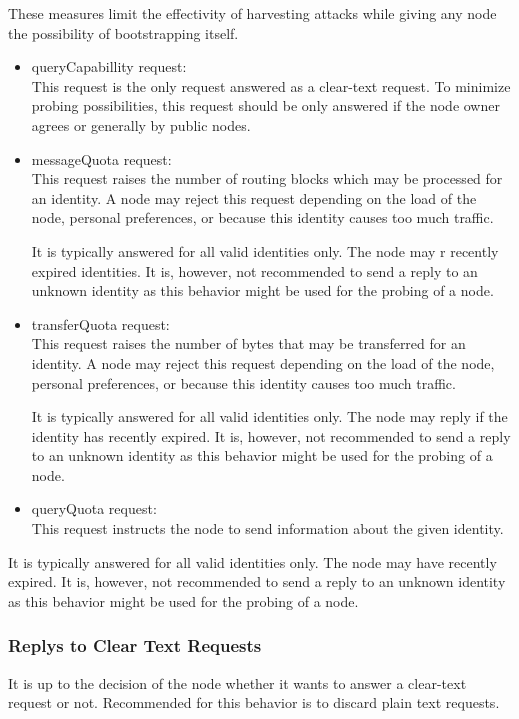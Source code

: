 These measures limit the effectivity of harvesting attacks while giving any node the possibility of bootstrapping itself.

\begin{itemize}
	\item queryCapabillity request:\\
	This request is the only request answered as a clear-text request. To minimize probing possibilities, this request should be only answered if the node owner agrees or generally by public nodes.
	
	\item messageQuota request:\\ 
	This request raises the number of routing blocks which may be processed for an identity. A node may reject this request depending on the load of the node, personal preferences, or because this identity causes too much traffic.
	
	It is typically answered for all valid identities only. The node may r recently expired identities. It is, however, not recommended to send a reply to an unknown identity as this behavior might be used for the probing of a node.
	
	\item transferQuota request:\\
	This request raises the number of bytes that may be transferred for an identity. A node may reject this request depending on the load of the node, personal preferences, or because this identity causes too much traffic.
	
	It is typically answered for all valid identities only. The node may reply if the identity has recently expired. It is, however, not recommended to send a reply to an unknown identity as this behavior might be used for the probing of a node.
	
	\item queryQuota request:\\
	This request instructs the node to send information about the given identity.
\end{itemize}

It is typically answered for all valid identities only. The node may have recently expired. It is, however, not recommended to send a reply to an unknown identity as this behavior might be used for the probing of a node.

\subsubsection{Replys to Clear Text Requests}
It is up to the decision of the node whether it wants to answer a clear-text request or not. Recommended for this behavior is to discard plain text requests. 

